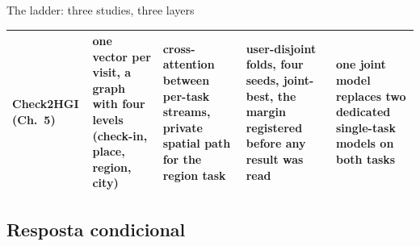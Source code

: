 \documentclass{beamer}
\begin{document}
\begin{frame}{The ladder: three studies, three layers}
{\begin{tabular}{@{}p{1.60cm} p{2.75cm} p{2.55cm} p{2.90cm} p{3.10cm}@{}}
        \addlinespace
        {\raggedright \textbf{Check2HGI} (Ch.~5)\par}
            & {\raggedright one vector per visit, a graph with four levels (check-in, place, region, city)\par}
            & {\raggedright cross-attention between per-task streams, private spatial path for the region task\par}
            & {\raggedright user-disjoint folds, four seeds, joint-best, the margin registered before any result was read\par}
            & {\raggedright one joint model replaces two dedicated single-task models on both tasks\par} \\
        \bottomrule
    \end{tabular}
    \par}
    \vfill
\end{frame}

\subsection{Resposta condicional}
\end{document}

